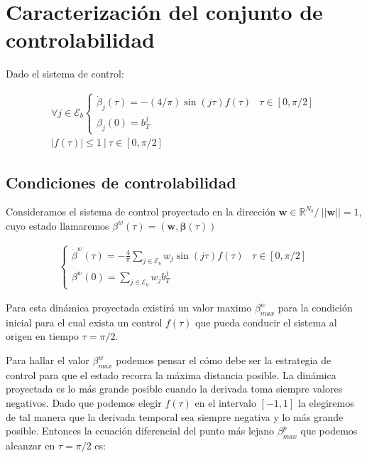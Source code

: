 
\section{Caracterización del conjunto de controlabilidad}

Dado el sistema de control:

\begin{gather}
    \forall j \in \mathcal{E}_b 
    \begin{cases}
        \dot{\beta}_j(\tau) =  -(4/\pi) \sin(j\tau) f(\tau) & \tau \in [0,\pi/2]\label{dyn}\\
        \beta_j(0) = b_T^j
    \end{cases} \\
    |f (\tau )|\leq 1 \ | \ \tau \in [0,\pi/2]
\end{gather}

\subsection{Condiciones de controlabilidad}

Consideramos el sistema de control proyectado en la dirección $\bm{w} \in \mathbb{R}^{N_b}  / \  ||\bm{w}|| = 1$, cuyo estado llamaremos $\beta^w(\tau) = (\bm{w},\bm{\beta}(\tau))$

\begin{gather}
    \begin{cases}
        \displaystyle \dot{\beta}^w(\tau) = -\frac{4}{\pi} \sum_{j\in \mathcal{E}_b} w_j \sin(j\tau) f(\tau) & \tau \in [0,\pi/2]\\
        \displaystyle \beta^w(0) = \sum_{j\in \mathcal{E}_b} w_j b_T^j   
    \end{cases}
\end{gather}

Para esta dinámica proyectada existirá un valor maximo  $\beta_{max}^w$ para la condición inicial para el cual exista un control $f(\tau)$ que pueda conducir el sistema al origen en tiempo $\tau = \pi/2$. 


Para hallar el valor $\beta_{max}^w$ podemos pensar el cómo debe ser la estrategia de control para que el estado recorra la máxima distancia posible. La dinámica proyectada es lo más grande posible cuando la derivada toma siempre valores negativos. Dado que podemos elegir $f(\tau)$ en el intervalo $[-1,1]$ la elegiremos de tal manera que la derivada temporal sea siempre negativa y lo más grande posible. Entonces la ecuación diferencial del punto más lejano $\beta_{max}^p$ que podemos alcanzar en $\tau = \pi/2$ es:

